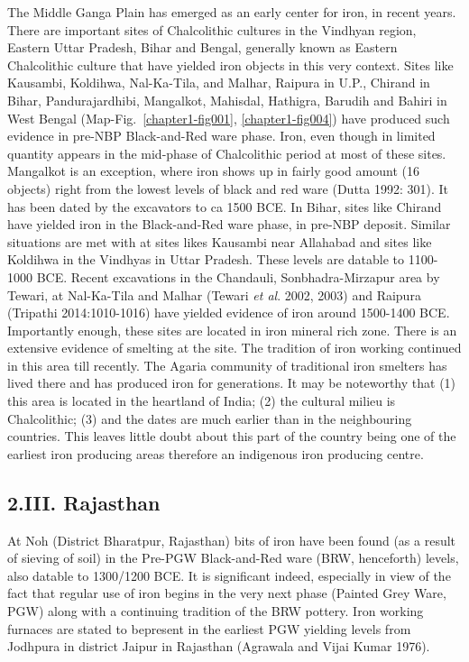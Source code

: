 The Middle Ganga Plain has emerged as an early center for iron, in recent years. There are important sites of Chalcolithic cultures in the Vindhyan region, Eastern Uttar Pradesh, Bihar and Bengal, generally known as Eastern Chalcolithic culture that have yielded iron objects in this very context. Sites like Kausambi, Koldihwa, Nal-Ka-Tila, and Malhar, Raipura in U.P., Chirand in Bihar, Pandurajardhibi, Mangalkot, Mahisdal, Hathigra, Barudih and Bahiri in West Bengal (Map-Fig.~\ref{chapter1-fig001}, \ref{chapter1-fig004}) have produced such evidence in pre-NBP Black-and-Red ware phase. Iron, even though in limited quantity appears in the mid-phase of Chalcolithic period at most of these sites. Mangalkot is an exception, where iron shows up in fairly good amount (16 objects) right from the lowest levels of black and red ware (Dutta 1992: 301). It has been dated by the excavators to ca 1500 BCE. In Bihar, sites like Chirand have yielded iron in the Black-and-Red ware phase, in pre-NBP deposit. Similar situations are met with at sites likes Kausambi near Allahabad and sites like Koldihwa in the Vindhyas in Uttar Pradesh. These levels are datable to 1100-1000 BCE. Recent excavations in the Chandauli, Sonbhadra-Mirzapur area by Tewari, at Nal-Ka-Tila and Malhar (Tewari \textit{et al}. 2002, 2003) and Raipura (Tripathi 2014:1010-1016) have yielded evidence of iron around 1500-1400 BCE. Importantly enough, these sites are located in iron mineral rich zone. There is an extensive evidence of smelting at the site. The tradition of iron working continued in this area till recently. The Agaria community of traditional iron smelters has lived there and has produced iron for generations. It may be noteworthy that (1) this area is located in the heartland of India; (2) the cultural milieu is Chalcolithic; (3) and the dates are much earlier than in the neighbouring countries. This leaves little doubt about this part of the country being one of the earliest iron producing areas therefore an indigenous iron producing centre.

\vspace{-.3cm}

\subsection*{2.III. Rajasthan}\label{subsection-6}

\vspace{-.2cm}

At Noh (District Bharatpur, Rajasthan) bits of iron have been found (as a result of sieving of soil) in the Pre-PGW Black-and-Red ware (BRW, henceforth) levels, also datable to 1300/1200 BCE. It is significant indeed, especially in view of the fact that regular use of iron begins in the very next phase (Painted Grey Ware, PGW) along with a continuing tradition of the BRW pottery. Iron working furnaces are stated to be\newpage present in the earliest PGW yielding levels from Jodhpura in district Jaipur in Rajasthan (Agrawala and Vijai Kumar 1976).

